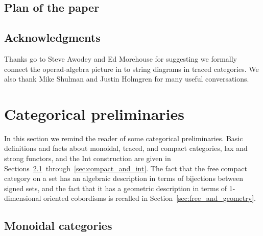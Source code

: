 \documentclass[12pt,oneside,article,draft]{memoir}
\begin{document}
\section{Plan of the paper} 


\section*{Acknowledgments}

Thanks go to Steve Awodey and Ed Morehouse for suggesting we formally connect the operad-algebra
picture in \cite{RupelSpivak} to string diagrams in traced categories. We also thank Mike Shulman and Justin Holmgren for many useful conversations.

\chapter{Categorical preliminaries}\label{sec:traced categories}

In this section we remind the reader of some categorical preliminaries. Basic definitions and facts
about monoidal, traced, and compact categories, lax and strong functors, and the Int construction
are given in Sections~\ref{sec:prelim_monoidal}~through~\ref{sec:compact_and_int}. The fact that
the free compact category on a set has an algebraic description in terms of bijections between
signed sets, and the fact that it has a geometric description in terms of 1-dimensional oriented
cobordisms is recalled in Section~\ref{sec:free_and_geometry}. 

\section{Monoidal categories}\label{sec:prelim_monoidal}
\end{document}
